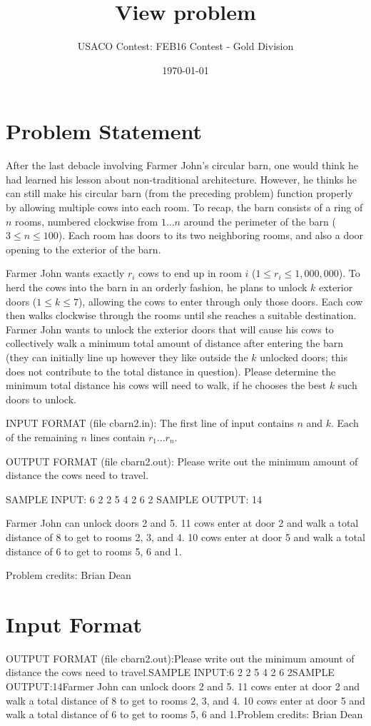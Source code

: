 \documentclass[12pt]{article}
\title{View problem}
\author{USACO Contest: FEB16 Contest - Gold Division}
\date{\today}
\begin{document}
\maketitle

\section*{Problem Statement}

After the last debacle involving Farmer John's circular barn, one would think he
had learned his lesson about non-traditional architecture.  However, he thinks
he can still make his circular barn (from the preceding problem) function
properly by allowing multiple cows into each room.  To recap, the barn consists
of a ring of $n$ rooms,  numbered clockwise from $1 \ldots n$ around the
perimeter of the barn ($3 \leq n \leq 100$).  Each room has doors to its two
neighboring rooms, and also a door opening to the exterior of the barn.

Farmer John wants exactly $r_i$ cows to end up in room $i$
($1 \leq r_i \leq 1,000,000$). To herd the cows into the barn in an orderly
fashion, he plans to unlock $k$ exterior doors ($1 \leq k \leq 7$), allowing the
cows to enter through only those doors. Each cow then walks clockwise through
the rooms until she reaches a suitable destination.  Farmer John wants to unlock
the exterior doors that will cause his cows to collectively walk a minimum total
amount of distance after entering the barn (they can initially line up however
they like outside the $k$ unlocked doors; this does not contribute to the total
distance in question).  Please determine the minimum total distance his cows
will need to walk, if he chooses the best $k$ such doors to unlock.  

INPUT FORMAT (file cbarn2.in):
The first line of input contains $n$ and $k$.  Each of the remaining $n$ lines
contain $r_1 \ldots r_n$.

OUTPUT FORMAT (file cbarn2.out):
Please write out the minimum amount of distance the cows need to travel.

SAMPLE INPUT:
6 2
2
5
4
2
6
2
SAMPLE OUTPUT: 
14

Farmer John can unlock doors 2 and 5.  11 cows enter at door 2 and walk a total
distance of 8 to get to rooms 2, 3, and 4.  10 cows enter at door 5 and walk a
total distance of 6 to get to rooms 5, 6 and 1.

Problem credits: Brian Dean



\section*{Input Format}
OUTPUT FORMAT (file cbarn2.out):Please write out the minimum amount of distance the cows need to travel.SAMPLE INPUT:6 2
2
5
4
2
6
2SAMPLE OUTPUT:14Farmer John can unlock doors 2 and 5.  11 cows enter at door 2 and walk a total
distance of 8 to get to rooms 2, 3, and 4.  10 cows enter at door 5 and walk a
total distance of 6 to get to rooms 5, 6 and 1.Problem credits: Brian Dean
\end{document}
